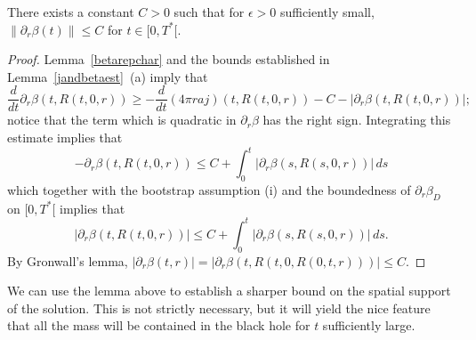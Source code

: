 \documentclass[11pt]{article}
\begin{document}
\begin{lemma}\label{betaprbound}
  There exists a constant $C>0$ such that for $\epsilon>0$ sufficiently small,
  $\|\partial_r \beta(t)\| \leq C$ for $t\in [0,T^\ast[$.
\end{lemma}
%
\begin{proof}
  Lemma~\ref{betarepchar} and the bounds established in
  Lemma~\ref{jandbetaest}~(a)
  imply that
  \[
  \frac{d}{dt} \partial_r \beta(t,R(t,0,r)) \geq
  - \frac{d}{dt}(4\pi r a j)(t,R(t,0,r)) - C -
  |\partial_r\beta(t,R(t,0,r))|;
  \]
  notice that the term which is quadratic in $\partial_r\beta$
  has the right sign.
  Integrating this estimate implies that
  \[
  - \partial_r \beta(t,R(t,0,r)) \leq C +
  \int_0^t |\partial_r\beta(s,R(s,0,r))|\, ds
  \]
  which together with the bootstrap assumption (i) and the boundedness of
  $\partial_r\beta_D$ on $[0,T^\ast[$ implies that
  \[
  |\partial_r \beta(t,R(t,0,r))|
  \leq C + \int_0^t |\partial_r\beta(s,R(s,0,r))|\, ds.
  \]
  By Gronwall's lemma,
  $|\partial_r \beta(t,r)|=|\partial_r \beta(t,R(t,0,R(0,t,r)))| \leq C$.
\end{proof}
  
We can use the lemma above to establish a sharper bound on the spatial support
of the solution. This is not strictly necessary,
but it will yield the nice feature
that all the mass will be contained in the black
hole for $t$ sufficiently large.
\end{document}
